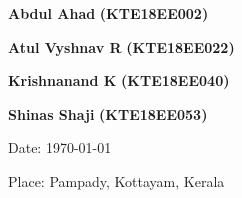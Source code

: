 



\vspace*{\fill}

\begin{multicols}{4}
\centering

\textbf{Abdul Ahad}
\vspace{0.2cm}
\textbf{(KTE18EE002)}\\
\vspace{0.2cm}

\textbf{Atul Vyshnav R}
\vspace{0.2cm}
\textbf{(KTE18EE022)}\\
\vspace{0.2cm}

\textbf{Krishnanand K}
\vspace{0.2cm}
\textbf{(KTE18EE040)}\\
\vspace{0.2cm}

\textbf{Shinas Shaji}
\vspace{0.2cm}
\textbf{(KTE18EE053)}\\
\vspace{0.2cm}

\end{multicols}

\vspace{1cm}
\begin{multicols}{2}

\flushleft Date: \today

\flushright Place: Pampady, Kottayam, Kerala

\end{multicols}

